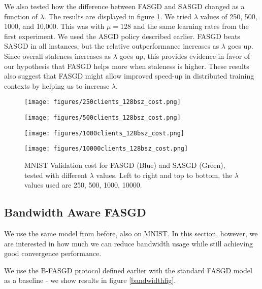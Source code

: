 \documentclass{article} %
\begin{document}
We also tested how the difference between FASGD and SASGD changed as a function of $\lambda$.
The results are displayed in figure \ref{clientfig}.
We tried $\lambda$ values of 250, 500, 1000, and 10,000.
This was with $\mu = 128$ and the same learning rates from the first experiment.
We used the ASGD policy described earlier.
FASGD beats SASGD in all instances, but the relative outperformance increases as $\lambda$ goes up.
Since overall staleness increases as $\lambda$ goes up, this provides evidence in favor of our hypothesis
that FASGD helps more when staleness is higher.
These results also suggest that FASGD might allow improved speed-up in distributed training contexts
by helping us to increase $\lambda$.

\begin{figure}[ht!]
  \centering
  \begin{minipage}[b]{0.5\linewidth}
    \texttt{[image: figures/250clients\_128bsz\_cost.png]}
  \end{minipage}%
  \begin{minipage}[b]{0.5\linewidth}
    \texttt{[image: figures/500clients\_128bsz\_cost.png]}
  \end{minipage} 
  \begin{minipage}[b]{0.5\linewidth}
    \texttt{[image: figures/1000clients\_128bsz\_cost.png]}
  \end{minipage}%
  \begin{minipage}[b]{0.5\linewidth}
    \texttt{[image: figures/10000clients\_128bsz\_cost.png]}
  \end{minipage}%
  \caption{MNIST Validation cost for FASGD (Blue) and SASGD (Green),
    tested with different $\lambda$ values.
    Left to right and top to bottom, the $\lambda$ values used are 250, 500,
    1000, 10000.
  }
  \label{clientfig} 
\end{figure}

\subsection{Bandwidth Aware FASGD}

We use the same model from before, also on MNIST.
In this section, however, we are interested in how much we can reduce bandwidth
usage while still achieving good convergence performance.

We use the B-FASGD protocol defined earlier with the standard FASGD model as a baseline - we
show results in figure \ref{bandwidthfig}.
\end{document}
